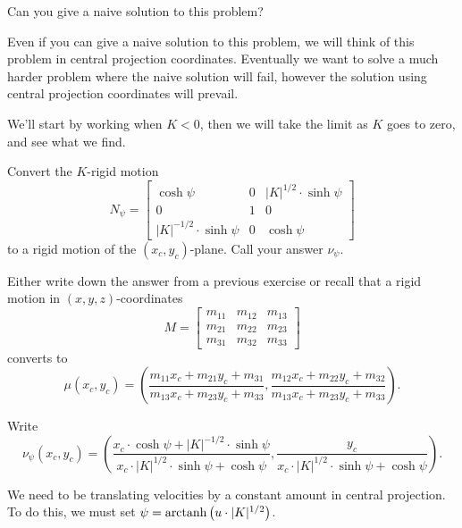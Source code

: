 \documentclass{ximera}
\begin{document}
\begin{problem}
  Can you give a naive solution to this problem?
\end{problem}
Even if you can give a naive solution to this problem, we will think
of this problem in central projection coordinates. Eventually we want
to solve a much harder problem where the naive solution will fail,
however the solution using central projection coordinates will
prevail. 

We'll start by working when $K<0$, then we will take the limit as $K$
goes to zero, and see what we find.

\begin{problem}
  Convert the $K$-rigid motion
  \[
  N_\psi=\begin{bmatrix}
  \cosh\psi & 0 & |K|^{1/2}\cdot\sinh\psi\\
  0 & 1 & 0\\
  |K|^{-1/2}\cdot\sinh\psi & 0 & \cosh\psi
\end{bmatrix}
  \]
  to a rigid motion of the $(x_c,y_c)$-plane. Call your answer $\nu_\psi$.
  \begin{hint}
    Either write down the answer from a previous exercise or recall
    that a rigid motion in $(x,y,z)$-coordinates
    \[
    M=\begin{bmatrix}
    m_{11} & m_{12} & m_{13}\\
    m_{21} & m_{22} & m_{23}\\
    m_{31} & m_{32} & m_{33}
    \end{bmatrix}
    \]
    converts to
    \[
    \mu(x_c,y_c) =
    \left(\frac{m_{11}x_{c}+m_{21}y_{c}+m_{31}}{m_{13}x_{c}+m_{23}y_{c}+m_{33}},
    \frac{m_{12}x_{c}+m_{22}y_{c}+m_{32}}{m_{13}x_{c}+m_{23}y_{c}+m_{33}
    }\right).
    \]
  \end{hint}
  \begin{freeResponse}
    Write
    \[
    \nu_\psi(x_c,y_c) = \left(\frac{x_c\cdot\cosh\psi+|K|^{-1/2}\cdot\sinh\psi}{x_c\cdot|K|^{1/2}\cdot\sinh\psi+\cosh\psi},\frac{y_c}{x_c\cdot|K|^{1/2}\cdot\sinh\psi+\cosh\psi}\right).
    \]
  \end{freeResponse}
\end{problem}

We need to be translating velocities by a constant amount in central
projection. To do this, we must set $\psi =\operatorname{arctanh}\left(u\cdot|K|^{1/2}\right)$.
\end{document}
